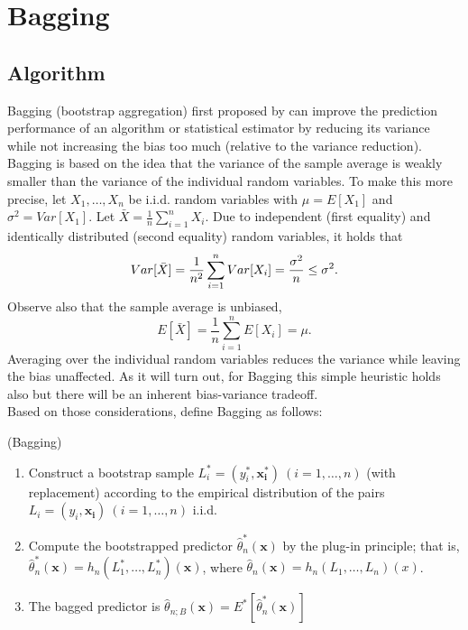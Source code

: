 \section{Bagging}\label{bag}

\subsection{Algorithm}
Bagging (bootstrap aggregation) first proposed by \cite{Breiman1996} can improve the prediction performance of an algorithm or statistical estimator by reducing its variance while not increasing the bias too much (relative to the variance reduction).\\
Bagging is based on the idea that the variance of the sample average is weakly smaller than the variance of the individual random variables.
To make this more precise, let $X_1, \dots, X_n$ be i.i.d. random variables with $\mu = E[X_1]$ and $\sigma^2 = Var[X_1]$.
Let $\bar{X}= \frac{1}{n}\sum_{i=1}^{n}X_{i}$.
Due to independent (first equality) and identically distributed (second equality) random variables, it holds that
$$
Var[\bar{X}]= \frac{1}{n^2} \sum_{i=1}^{n} Var[X_i]=\\
\frac{\sigma^2}{n} \leq \sigma^2.
$$
Observe also that the sample average is unbiased,
$$
E[\bar{X}]= \frac{1}{n} \sum_{i=1}^{n} E[X_i] = \mu.
$$
Averaging over the individual random variables reduces the variance while leaving the bias unaffected.
As it will turn out, for Bagging this simple heuristic holds also but there will be an inherent bias-variance tradeoff.\\
Based on those considerations, \cite{Buhlmann2002} define Bagging as follows:

\begin{definition}\label{bagging}(Bagging)
	\begin{enumerate}
	\item Construct a bootstrap sample $L_{i}^{*} = (y_{i}^{*}, \mathbf{x_{i}^{*}}) \:(i = 1, \dots , n)$ (with replacement) according to the empirical distribution of the pairs $L_{i} = (y_{i}, \mathbf{x_{i}}) \: (i = 1, \dots , n)$ i.i.d.
	\item Compute the bootstrapped predictor $\hat{\theta}_{n}^{*}(\mathbf{x})$ by the plug-in principle; that is, $\hat{\theta}_{n}^{*}(\mathbf{x}) = h_{n}(L_{1}^{*}, \dots, L_{n}^{*})(\mathbf{x})$, where $\hat{\theta}_{n}(\mathbf{x}) = h_{n}(L_{1},\dots, L_{n})(x)$.
	\item The bagged predictor is $\hat{\theta}_{n;B}(\mathbf{x}) = E^{*} [\hat{\theta}_{n}^{*}(\mathbf{x})]$
	\end{enumerate}
\end{definition}

